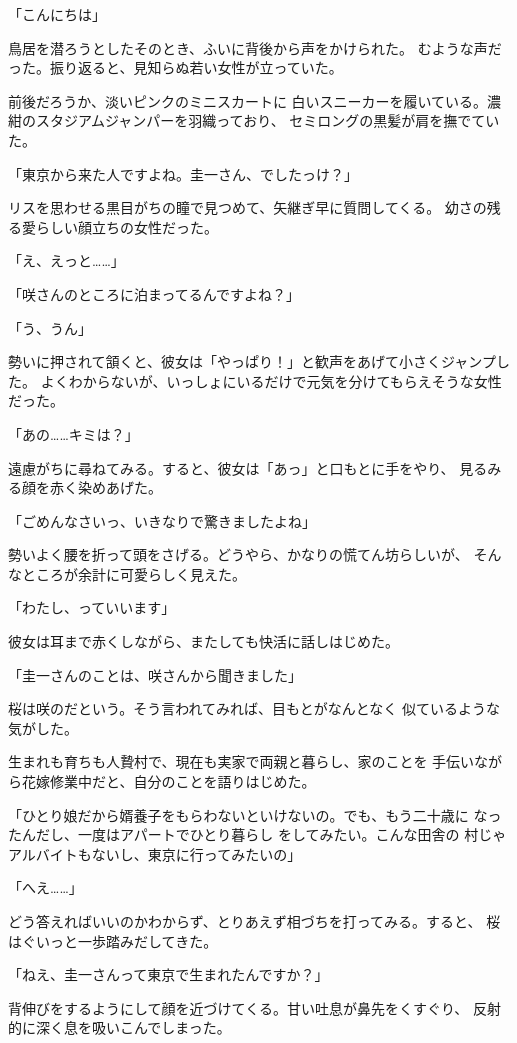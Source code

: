 ﻿\documentclass[
    book,tate,
    line_length=30zw,
    jafontsize=12pt,
    paper=b5j,
    landscape,
    ]{jlreq}
\begin{document}
「こんにちは」

鳥居を潜ろうとしたそのとき、ふいに背後から声をかけられた。
むような声だった。振り返ると、見知らぬ若い女性が立っていた。

前後だろうか、淡いピンクのミニスカートに
白いスニーカーを履いている。濃紺のスタジアムジャンパーを羽織っており、
セミロングの黒髪が肩を撫でていた。

「東京から来た人ですよね。圭一さん、でしたっけ？」

リスを思わせる黒目がちの瞳で見つめて、矢継ぎ早に質問してくる。
幼さの残る愛らしい顔立ちの女性だった。

「え、えっと……」

「咲さんのところに泊まってるんですよね？」

「う、うん」

勢いに押されて頷くと、彼女は「やっぱり！」と歓声をあげて小さくジャンプした。
よくわからないが、いっしょにいるだけで元気を分けてもらえそうな女性だった。

「あの……キミは？」

遠慮がちに尋ねてみる。すると、彼女は「あっ」と口もとに手をやり、
見るみる顔を赤く染めあげた。

「ごめんなさいっ、いきなりで驚きましたよね」

勢いよく腰を折って頭をさげる。どうやら、かなりの慌てん坊らしいが、
そんなところが余計に可愛らしく見えた。

「わたし、っていいます」

彼女は耳まで赤くしながら、またしても快活に話しはじめた。

「圭一さんのことは、咲さんから聞きました」

桜は咲のだという。そう言われてみれば、目もとがなんとなく
似ているような気がした。

生まれも育ちも人贄村で、現在も実家で両親と暮らし、家のことを
手伝いながら花嫁修業中だと、自分のことを語りはじめた。

「ひとり娘だから婿養子をもらわないといけないの。でも、もう二十歳に
なったんだし、一度はアパートでひとり暮らし をしてみたい。こんな田舎の
村じゃアルバイトもないし、東京に行ってみたいの」

「へえ……」

どう答えればいいのかわからず、とりあえず相づちを打ってみる。すると、
桜はぐいっと一歩踏みだしてきた。

「ねえ、圭一さんって東京で生まれたんですか？」

背伸びをするようにして顔を近づけてくる。甘い吐息が鼻先をくすぐり、
反射的に深く息を吸いこんでしまった。
\end{document}
